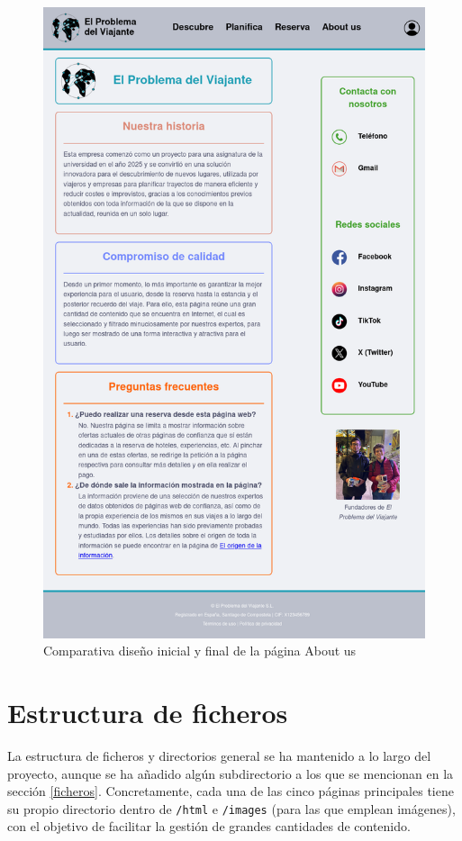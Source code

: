 \documentclass[11pt, a4paper]{book}
\begin{document}
\begin{figure} [H]
\begin{minipage}[c]{0.45\textwidth}
			\includegraphics[width=\textwidth]{full-5.png}
		\end{minipage}
		\caption{Comparativa diseño inicial y final de la página About us}
	\end{figure}
	
	
	\section{Estructura de ficheros}
    La estructura de ficheros y directorios general se ha mantenido a lo largo del proyecto, aunque se ha añadido algún subdirectorio a los que se mencionan en la sección \ref{ficheros}. Concretamente, cada una de las cinco páginas principales tiene su propio directorio dentro de \texttt{/html} e \texttt{/images} (para las que emplean imágenes), con el objetivo de facilitar la gestión de grandes cantidades de contenido. 
\end{document}
